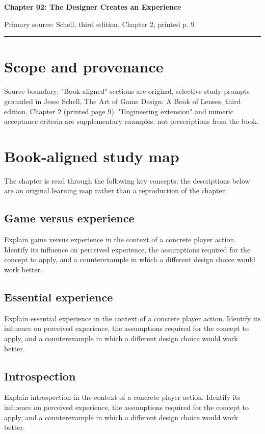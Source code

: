 \documentclass[11pt]{article}
\begin{document}
{\huge\bfseries\color{suiteblue} Chapter 02: The Designer Creates an Experience}\par
\vspace{0.15in}
{\normalsize\color{suitegray} Primary source: Schell, third edition, Chapter 2, printed p. 9}\par
\vspace{0.15in}\hrule\vspace{0.15in}

\section{Scope and provenance}
Source boundary: "Book-aligned" sections are original, selective study prompts grounded in Jesse Schell, The Art of Game Design: A Book of Lenses, third edition, Chapter 2 (printed page 9). "Engineering extension" and numeric acceptance criteria are supplementary examples, not prescriptions from the book.


\section{Book-aligned study map}
The chapter is read through the following key concepts; the descriptions below are an original learning map rather than a reproduction of the chapter.


\subsection{Game versus experience}
Explain game versus experience in the context of a concrete player action. Identify its influence on perceived experience, the assumptions required for the concept to apply, and a counterexample in which a different design choice would work better.


\subsection{Essential experience}
Explain essential experience in the context of a concrete player action. Identify its influence on perceived experience, the assumptions required for the concept to apply, and a counterexample in which a different design choice would work better.


\subsection{Introspection}
Explain introspection in the context of a concrete player action. Identify its influence on perceived experience, the assumptions required for the concept to apply, and a counterexample in which a different design choice would work better.
\end{document}

